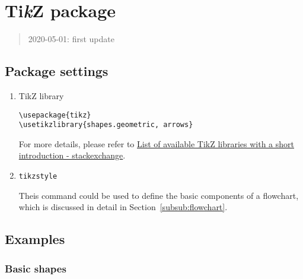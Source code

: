 \section{Ti\textit{k}Z package}

\begin{quote}
    2020-05-01: first update
\end{quote}


\subsection{Package settings}

\begin{enumerate}
    \item TikZ library

\begin{lstlisting}[language=Tex]
\usepackage{tikz}
\usetikzlibrary{shapes.geometric, arrows}
\end{lstlisting}

For more details, please refer to \href{https://tex.stackexchange.com/questions/42611/list-of-available-tikz-libraries-with-a-short-introduction}{List of available TikZ libraries with a short introduction - stackexchange}.

\item \texttt{tikzstyle}

Theis command could be used to define the basic components of a flowchart, which is discussed in detail in Section~\ref{subsub:flowchart}.

\end{enumerate}


\subsection{Examples}

\subsubsection{Basic shapes}

